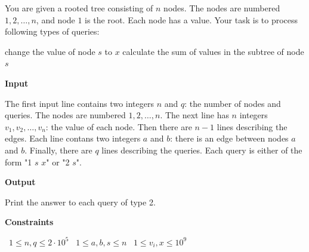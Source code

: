 You are given a rooted tree consisting of $n$ nodes. The nodes are numbered $1,2,\ldots,n$, and node $1$ is the root. Each node has a value.
Your task is to process following types of queries:

change the value of node $s$ to $x$
calculate the sum of values in the subtree of node $s$

\vspace{0.3cm}\noindent\textbf{Input}

The first input line contains two integers $n$ and $q$: the number of nodes and queries. The nodes are numbered $1,2,\ldots,n$.
The next line has $n$ integers $v_1,v_2,\ldots,v_n$: the value of each node.
Then there are $n-1$ lines describing the edges. Each line contans two integers $a$ and $b$: there is an edge between nodes $a$ and $b$.
Finally, there are $q$ lines describing the queries. Each query is either of the form "1 $s$ $x$" or "2 $s$".

\vspace{0.3cm}\noindent\textbf{Output}

Print the answer to each query of type 2.

\vspace{0.3cm}\noindent\textbf{Constraints}

\textbullet\ $1 \le n, q \le 2 \cdot 10^5$
\textbullet\ $1 \le a,b, s \le n$
\textbullet\ $1 \le v_i, x \le 10^9$